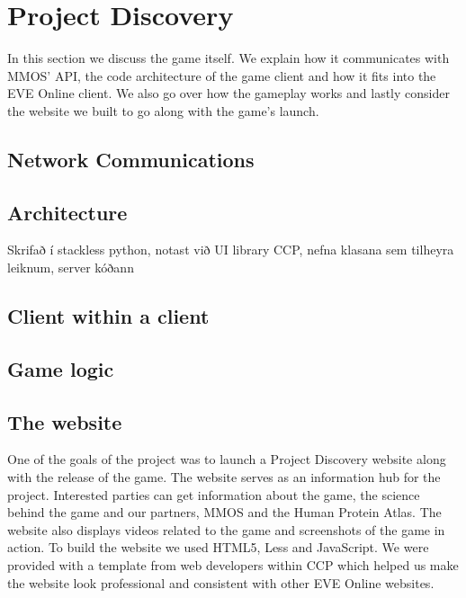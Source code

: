 \section{Project Discovery}\label{sec:projectdiscovery}

In this section we discuss the game itself. We explain how it communicates with MMOS' API, the code architecture of the game client and how it fits into the EVE Online client. We also go over how the gameplay works and lastly consider the website we built to go along with the game's launch.

\subsection{Network Communications}


\subsection{Architecture}

Skrifað í stackless python, notast við UI library CCP, nefna klasana sem tilheyra leiknum, server kóðann

\subsection{Client within a client}

\subsection{Game logic}

\subsection{The website}
One of the goals of the project was to launch a Project Discovery website along with the release of the game. The website serves as an information hub for the project. Interested parties can get information about the game, the science behind the game and our partners, MMOS and the Human Protein Atlas. The website also displays videos related to the game and screenshots of the game in action. To build the website we used HTML5, Less and JavaScript. We were provided with a template from web developers within CCP which helped us make the website look professional and consistent with other EVE Online websites.